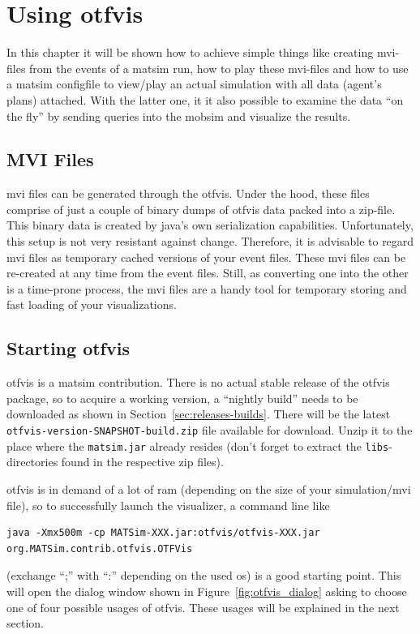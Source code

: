 \section{Using \gls{otfvis}} 
In this chapter it will be shown how to achieve simple things like creating \gls{mvi}-files from the events of a \gls{matsim} run, how to play these \gls{mvi}-files and how to use a \gls{matsim} \gls{configfile} to view/play an actual simulation with all data (\eg agent's plans) attached. With the latter one, it it also possible to examine the data ``on the fly'' by sending queries into the \gls{mobsim} and visualize the results.

\subsection{MVI Files}
\gls{mvi} files can be generated through the \gls{otfvis}. Under the hood, these files comprise of just a couple of binary dumps of \gls{otfvis} data packed into a zip-file. This binary data is created by \gls{java}'s own serialization capabilities. Unfortunately, this setup is not very resistant against change. Therefore, it is advisable to regard \gls{mvi} files as temporary cached versions of your event files. These \gls{mvi} files can be re-created at any time from the event files. Still, as converting one into the other is a time-prone process, the \gls{mvi} files are a handy tool for temporary storing and fast loading of your visualizations.

\subsection{Starting \gls{otfvis}}
\gls{otfvis} is a \gls{matsim} \gls{contribution}. 
There is no actual stable release of the \gls{otfvis} package, 
so to acquire a working version, a ``nightly build'' needs to be downloaded as shown in Section~\ref{sec:releases-builds}. 
There will be the latest \lstinline|otfvis-version-SNAPSHOT-build.zip| file available for download. 
Unzip it to the place where the \lstinline|matsim.jar| already resides (don't forget to extract the \lstinline|libs|-directories found in the respective zip files). 

\gls{otfvis} is in demand of a lot of \gls{ram} (depending on the size of your simulation/\gls{mvi} file), so to successfully launch the visualizer, a command line like 
\begin{lstlisting}
java -Xmx500m -cp MATSim-XXX.jar:otfvis/otfvis-XXX.jar org.MATSim.contrib.otfvis.OTFVis
\end{lstlisting}
(exchange ``;'' with ``:'' depending on the used \gls{os})
is a good starting point. 
This will open the dialog window shown in Figure~\ref{fig:otfvis_dialog} asking to choose one of four possible usages of \gls{otfvis}. 
These usages will be explained in the next section.


